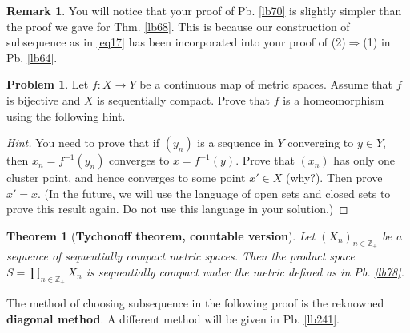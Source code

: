 \documentclass[12pt,b5paper,notitlepage]{article}
\theoremstyle{definition}
\newtheorem{rem}[df]{Remark}
\newtheorem{prob}{\color{red}Problem}[section]
\theoremstyle{plain}
\newtheorem{thm}[df]{Theorem}
\newcommand{\Zbb}{\mathbb Z}
\newcommand{\dps}{\displaystyle}
\numberwithin{equation}{section}
\begin{document}
\begin{rem}
You will notice that your proof of Pb. \ref{lb70} is slightly simpler than the proof we gave for Thm. \ref{lb68}. This is because our construction of subsequence as in \eqref{eq17} has been incorporated into your proof of (2)$\Rightarrow$(1) in Pb. \ref{lb64}.
\end{rem}

\begin{prob}\label{lb235}
Let $f:X\rightarrow Y$ be a continuous map of metric spaces. Assume that $f$ is bijective and $X$ is sequentially compact.  Prove that $f$ is a homeomorphism using the following hint.
\end{prob}

\begin{proof}[Hint]
You need to prove that if $(y_n)$ is a sequence in $Y$ converging to $y\in Y$, then $x_n=f^{-1}(y_n)$ converges to $x=f^{-1}(y)$. Prove that $(x_n)$ has only one cluster point, and hence converges to some point $x'\in X$ (why?). Then prove $x'=x$. (In the future, we will use the language of open sets and closed sets to prove this result again. Do not use this language in your solution.)
\end{proof}




\begin{thm}[\textbf{Tychonoff theorem, countable version}]  \label{lb89}
Let $(X_n)_{n\in\Zbb_+}$ be a sequence of sequentially compact metric spaces. Then the product space $\dps S=\prod_{n\in\Zbb_+} X_n$ is sequentially compact under the metric defined  as in Pb. \ref{lb78}.
\end{thm}

The method of choosing subsequence in the following proof is the reknowned \textbf{diagonal method}.  A different method will be given in Pb. \ref{lb241}.
\end{document}
